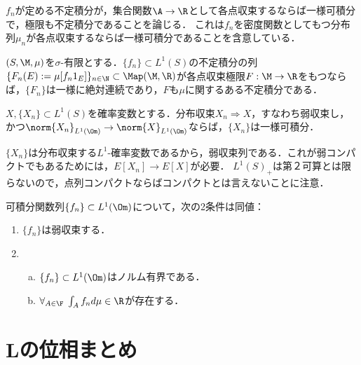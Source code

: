 \documentclass[uplatex,dvipdfmx]{jsreport}
\begin{document}
\begin{tcolorbox}[colframe=ForestGreen, colback=ForestGreen!10!white,breakable,colbacktitle=ForestGreen!40!white,coltitle=black,fonttitle=\bfseries\sffamily,
title=Vitali-Hahn-Saksの定理]
    $f_n$が定める不定積分が，集合関数$\A\to\R$として各点収束するならば一様可積分で，極限も不定積分であることを論じる．
    これは$f_n$を密度関数としてもつ分布列$\mu_n$が各点収束するならば一様可積分であることを含意している．
\end{tcolorbox}

\begin{theorem}
    $(S,\M,\mu)$を$\sigma$-有限とする．$\{f_n\}\subset L^1(S)$の不定積分の列$\{F_n(E):=\mu [f_n1_E]\}_{n\in\N}\subset\Map(\M,\R)$が各点収束極限$F:\M\to\R$をもつならば，$\{F_n\}$は一様に絶対連続であり，$F$も$\mu$に関するある不定積分である．
\end{theorem}

\begin{corollary}
    $X,\{X_n\}\subset L^1(S)$を確率変数とする．分布収束$X_n\Rightarrow X$，すなわち弱収束し，かつ$\norm{X_n}_{L^1(\Om)}\to\norm{X}_{L^1(\Om)}$ならば，$\{X_n\}$は一様可積分．
\end{corollary}
\begin{remarks}
    $\{X_n\}$は分布収束する$L^1$-確率変数であるから，弱収束列である．これが弱コンパクトでもあるためには，$E[X_n]\to E[X]$が必要．
    $L^1(S)_+$は第２可算とは限らないので，点列コンパクトならばコンパクトとは言えないことに注意．
\end{remarks}

\begin{corollary}[弱収束のSaks流の特徴付け]
    可積分関数列$\{f_n\}\subset L^1(\Om)$について，次の2条件は同値：
    \begin{enumerate}
        \item $\{f_n\}$は弱収束する．
        \item \begin{enumerate}[(a)]
            \item $\{f_n\}\subset L^1(\Om)$はノルム有界である．
            \item $\forall_{A\in\F}\;\int_Af_nd\mu\in\R$が存在する．
        \end{enumerate}
    \end{enumerate}
\end{corollary}

\section{Lの位相まとめ}
\end{document}
